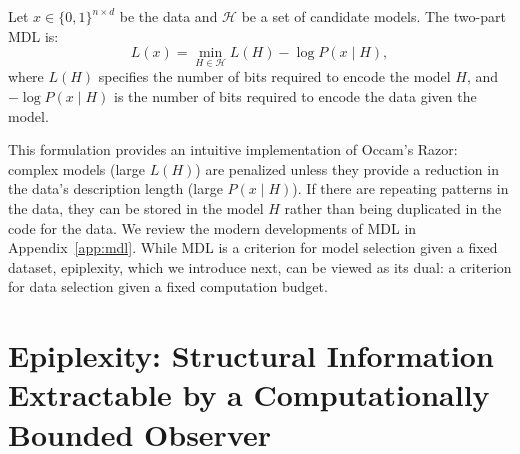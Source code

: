 \documentclass[twoside]{article}
\begin{document}
\begin{definition}
Let $x \in \{0,1\}^{n \times d}$ be the data and $\mathcal{H}$ be a set of candidate models. The two-part MDL is:
$$L(x) = \min_{H\in \mathcal{H}} L(H) -\log P(x \mid H),$$
where $L(H)$ specifies the number of bits required to encode the model $H$, and $-\log P(x \mid H)$
is the number of bits required to encode the data given the model.
\end{definition}
This formulation provides an intuitive implementation of Occam's Razor: complex models (large $L(H)$) are penalized unless they provide a reduction in the data's description length (large $P(x\mid H)$).
%
If there are repeating patterns in the data, they can be stored in the model $H$ rather than being duplicated in the code for the data. 
We review the modern developments of MDL in Appendix~\ref{app:mdl}.
While MDL is a criterion for model selection given a fixed dataset, epiplexity, which we introduce next, can be viewed as its dual: a criterion for data selection given a fixed computation budget.
%

%





%
%
%
%
%
%
%
%
%
%
%

%
%
%
%

%
%

%
%
%
%
%
%
%
%
%
%
%

%
%
%
%

%
%
%
%
%
%
%
%
%

%
%
%
%
%
%
%
%
%

%
%
%
%
%
%
%
%

%
%
%
%
%
%
%
%
%
%
%
%
%
%
%
%
%
%
%
%
%
%

%
%
%

%
%
%
%
%

%
%
%

%
%
%

%
%
%
%
%
%
%
%
%
%

%
%
%
%
%
%
%

%

%
%

%
%
%
%

%
%
%
%
%
%
%
%

%
%
%

\section{Epiplexity: Structural Information Extractable by a Computationally Bounded Observer}
\label{sec:epiplexity}
\end{document}
